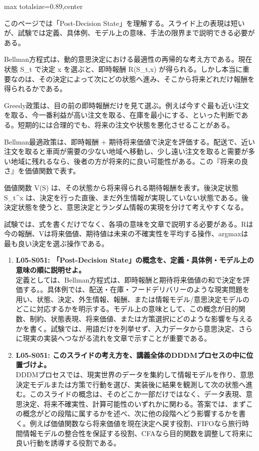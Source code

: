 \begin{minipage}[t]{0.58\textwidth}
\begin{adjustbox}{max totalsize={\textwidth}{0.89\textheight},center}
\begin{minipage}{\textwidth}\scriptsize
{}このページでは「Post-Decision State」を理解する。スライド上の表現は短いが、試験では定義、具体例、モデル上の意味、手法の限界まで説明できる必要がある。\par
Bellman方程式は、動的意思決定における最適性の再帰的な考え方である。現在状態 S\_t で決定 x を選ぶと、即時報酬 R(S\_t,x) が得られる。しかし本当に重要なのは、その決定によって次にどの状態へ進み、そこから将来どれだけ報酬を得られるかである。\par
Greedy政策は、目の前の即時報酬だけを見て選ぶ。例えば今すぐ最も近い注文を取る、今一番利益が高い注文を取る、在庫を最小にする、といった判断である。短期的には合理的でも、将来の注文や状態を悪化させることがある。\par
Bellman最適政策は、即時報酬 + 期待将来価値で決定を評価する。配送で、近い注文を取ると車両が需要の少ない地域へ移動し、少し遠い注文を取ると需要が多い地域に残れるなら、後者の方が将来的に良い可能性がある。この『将来の良さ』を価値関数で表す。\par
価値関数 V(S) は、その状態から将来得られる期待報酬を表す。後決定状態 S\_t\textasciicircum{}x は、決定を行った直後、まだ外生情報が実現していない状態である。後決定状態を使うと、意思決定とランダム情報の実現を分けて考えやすくなる。\par
試験では、式を書くだけでなく、各項の意味を文章で説明する必要がある。Rは今の報酬、Vは将来価値、期待値は未来の不確実性を平均する操作、argmaxは最も良い決定を選ぶ操作である。\par{}\begin{enumerate}\item \textbf{L05-S051: 「Post-Decision State」の概念を、定義・具体例・モデル上の意味の順に説明せよ。}\\定義としては、Bellman方程式は、即時報酬と期待将来価値の和で決定を評価する。。具体例では、配送・在庫・フードデリバリーのような現実問題を用い、状態、決定、外生情報、報酬、または情報モデル/意思決定モデルのどこに対応するかを明示する。モデル上の意味として、この概念が目的関数、制約、状態表現、将来価値、または方策選択にどのような影響を与えるかを書く。試験では、用語だけを列挙せず、入力データから意思決定、さらに現実の実装へつながる流れを文章で示すことが重要である。\item \textbf{L05-S051: このスライドの考え方を、講義全体のDDDMプロセスの中に位置づけよ。}\\DDDMプロセスでは、現実世界のデータを集約して情報モデルを作り、意思決定モデルまたは方策で行動を選び、実装後に結果を観測して次の状態へ進む。このスライドの概念は、そのどこか一部だけではなく、データ表現、意思決定、将来不確実性、計算可能性のいずれかに関わる。答案では、まずこの概念がどの段階に属するかを述べ、次に他の段階へどう影響するかを書く。例えば価値関数なら将来価値を現在決定へ戻す役割、FIFOなら旅行時間情報モデルの整合性を保証する役割、CFAなら目的関数を調整して将来に良い行動を誘導する役割である。\end{enumerate}

\end{minipage}
\end{adjustbox}
\end{minipage}
